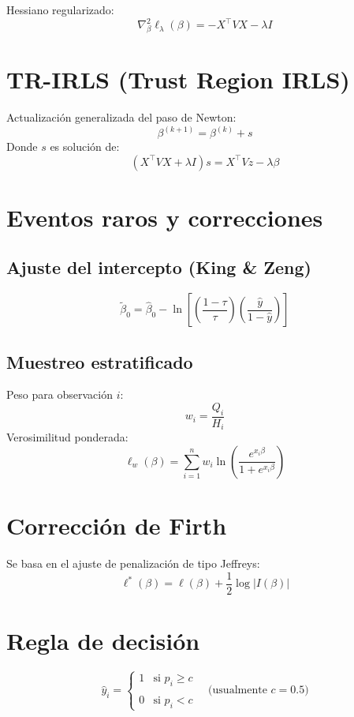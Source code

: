 \documentclass[12pt]{article}
\begin{document}
Hessiano regularizado:
\[
\nabla^2_\beta \ell_\lambda(\beta) = - X^\top V X - \lambda I
\]

\section*{TR-IRLS (Trust Region IRLS)}
Actualización generalizada del paso de Newton:
\[
\beta^{(k+1)} = \beta^{(k)} + s
\]
Donde $s$ es solución de:
\[
(X^\top V X + \lambda I) s = X^\top V z - \lambda \beta
\]

\section*{Eventos raros y correcciones}
\subsection*{Ajuste del intercepto (King \& Zeng)}
\[
\tilde{\beta}_0 = \hat{\beta}_0 - \ln \left[ \left( \frac{1 - \tau}{\tau} \right) \left( \frac{\hat{y}}{1 - \hat{y}} \right) \right]
\]

\subsection*{Muestreo estratificado}
Peso para observación $i$:
\[
w_i = \frac{Q_i}{H_i}
\]
Verosimilitud ponderada:
\[
\ell_w(\beta) = \sum_{i=1}^n w_i \ln \left( \frac{e^{x_i \beta}}{1 + e^{x_i \beta}} \right)
\]

\section*{Corrección de Firth}
Se basa en el ajuste de penalización de tipo Jeffreys:
\[
\ell^*(\beta) = \ell(\beta) + \frac{1}{2} \log |I(\beta)|
\]

\section*{Regla de decisión}
\[
\hat{y}_i =
\begin{cases}
1 & \text{si } p_i \geq c \\\\
0 & \text{si } p_i < c
\end{cases}
\quad \text{(usualmente } c = 0.5)
\]
\end{document}
